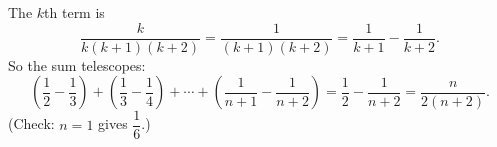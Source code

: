 The $k$th term is
\[\dfrac{k}{k(k+1)(k+2)}=\dfrac{1}{(k+1)(k+2)}=\dfrac{1}{k+1}-\dfrac{1}{k+2}.\]
So the sum telescopes:
\[\left(\dfrac{1}{2}-\dfrac{1}{3}\right)+\left(\dfrac{1}{3}-\dfrac{1}{4}\right)+\cdots+\left(\dfrac{1}{n+1}-\dfrac{1}{n+2}\right)=\dfrac{1}{2}-\dfrac{1}{n+2}=\boxed{\dfrac{n}{2(n+2)}}.\]
(Check: $n=1$ gives $\dfrac{1}{6}$.)
